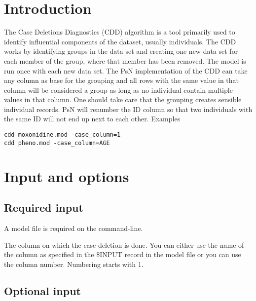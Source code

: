 



\maketitle


\section{Introduction}
The Case Deletions Diagnostics (CDD) algorithm is a tool primarily used to identify influential components of the dataset, usually individuals. The CDD works by identifying groups in the data set and creating one new data set for each member of the group, where that member has been removed. The model is run once with each new data set. The PsN implementation of the CDD can take any column as base for the grouping and all rows with the same value in that column will be considered a group as long as no individual contain multiple values in that column.
One should take care that the grouping creates sensible individual records. PsN will renumber the ID column so that two individuals with the same ID will not end up next to each other.
Examples
\begin{verbatim}
cdd moxonidine.mod -case_column=1
cdd pheno.mod -case_column=AGE
\end{verbatim}

\section{Input and options}

\subsection{Required input}
A model file is required on the command-line.

\begin{optionlist}
The column on which the case-deletion is done. You can either use the name of the column as specified in the \mbox{\$INPUT} record in the model file or you can use the column number. Numbering starts with 1.

\nextopt
\end{optionlist}

\subsection{Optional input}

